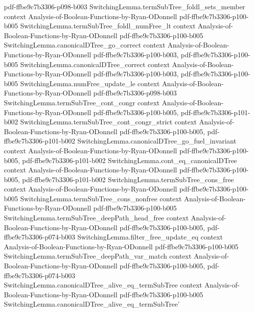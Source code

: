 \begin{theorem}
  {pdf-ffbe9c7b3306-p098-b003}
\proofstep
  {SwitchingLemma.termSubTree_foldl_sets_member}
  {context}
  {Analysis-of-Boolean-Functions-by-Ryan-ODonnell}
  {pdf-ffbe9c7b3306-p100-b005}
\proofstep
  {SwitchingLemma.termSubTree_foldl_numFree_lt}
  {context}
  {Analysis-of-Boolean-Functions-by-Ryan-ODonnell}
  {pdf-ffbe9c7b3306-p100-b005}
\proofstep
  {SwitchingLemma.canonicalDTree_go_correct}
  {context}
  {Analysis-of-Boolean-Functions-by-Ryan-ODonnell}
  {pdf-ffbe9c7b3306-p100-b003,
    pdf-ffbe9c7b3306-p100-b005}
\proofstep
  {SwitchingLemma.canonicalDTree_correct}
  {context}
  {Analysis-of-Boolean-Functions-by-Ryan-ODonnell}
  {pdf-ffbe9c7b3306-p100-b003,
    pdf-ffbe9c7b3306-p100-b005}
\proofstep
  {SwitchingLemma.numFree_update_le}
  {context}
  {Analysis-of-Boolean-Functions-by-Ryan-ODonnell}
  {pdf-ffbe9c7b3306-p098-b003}
\proofstep
  {SwitchingLemma.termSubTree_cont_congr}
  {context}
  {Analysis-of-Boolean-Functions-by-Ryan-ODonnell}
  {pdf-ffbe9c7b3306-p100-b005,
    pdf-ffbe9c7b3306-p101-b002}
\proofstep
  {SwitchingLemma.termSubTree_cont_congr_strict}
  {context}
  {Analysis-of-Boolean-Functions-by-Ryan-ODonnell}
  {pdf-ffbe9c7b3306-p100-b005,
    pdf-ffbe9c7b3306-p101-b002}
\proofstep
  {SwitchingLemma.canonicalDTree_go_fuel_invariant}
  {context}
  {Analysis-of-Boolean-Functions-by-Ryan-ODonnell}
  {pdf-ffbe9c7b3306-p100-b005,
    pdf-ffbe9c7b3306-p101-b002}
\proofstep
  {SwitchingLemma.cont_eq_canonicalDTree}
  {context}
  {Analysis-of-Boolean-Functions-by-Ryan-ODonnell}
  {pdf-ffbe9c7b3306-p100-b005,
    pdf-ffbe9c7b3306-p101-b002}
\proofstep
  {SwitchingLemma.termSubTree_cons_free}
  {context}
  {Analysis-of-Boolean-Functions-by-Ryan-ODonnell}
  {pdf-ffbe9c7b3306-p100-b005}
\proofstep
  {SwitchingLemma.termSubTree_cons_nonfree}
  {context}
  {Analysis-of-Boolean-Functions-by-Ryan-ODonnell}
  {pdf-ffbe9c7b3306-p100-b005}
\proofstep
  {SwitchingLemma.termSubTree_deepPath_head_free}
  {context}
  {Analysis-of-Boolean-Functions-by-Ryan-ODonnell}
  {pdf-ffbe9c7b3306-p100-b005,
    pdf-ffbe9c7b3306-p074-b003}
\proofstep
  {SwitchingLemma.filter_free_update_eq}
  {context}
  {Analysis-of-Boolean-Functions-by-Ryan-ODonnell}
  {pdf-ffbe9c7b3306-p100-b005}
\proofstep
  {SwitchingLemma.termSubTree_deepPath_var_match}
  {context}
  {Analysis-of-Boolean-Functions-by-Ryan-ODonnell}
  {pdf-ffbe9c7b3306-p100-b005,
    pdf-ffbe9c7b3306-p074-b003}
\proofstep
  {SwitchingLemma.canonicalDTree_alive_eq_termSubTree}
  {context}
  {Analysis-of-Boolean-Functions-by-Ryan-ODonnell}
  {pdf-ffbe9c7b3306-p100-b005}
\proofstep
  {SwitchingLemma.canonicalDTree_alive_eq_termSubTree'}

\end{theorem}

